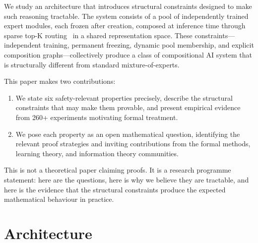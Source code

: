 \documentclass[11pt,a4paper]{article}
\begin{document}
We study an architecture that introduces structural constraints designed to make such reasoning tractable.
The system consists of a pool of independently trained expert modules, each frozen after creation, composed at inference time through sparse top-K routing~\cite{shazeer2017outrageously} in a shared representation space.
These constraints---independent training, permanent freezing, dynamic pool membership, and explicit composition graphs---collectively produce a class of compositional AI system that is structurally different from standard mixture-of-experts.

This paper makes two contributions:
\begin{enumerate}[nosep]
  \item We state six safety-relevant properties precisely, describe the structural constraints that may make them provable, and present empirical evidence from 260+ experiments motivating formal treatment.
  \item We pose each property as an open mathematical question, identifying the relevant proof strategies and inviting contributions from the formal methods, learning theory, and information theory communities.
\end{enumerate}

\noindent This is not a theoretical paper claiming proofs.
It is a research programme statement: here are the questions, here is why we believe they are tractable, and here is the evidence that the structural constraints produce the expected mathematical behaviour in practice.

\section{Architecture}
\label{sec:arch}
\end{document}
